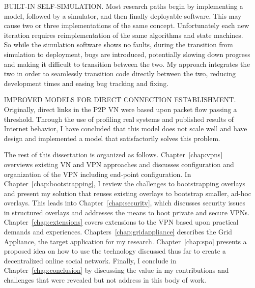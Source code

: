 BUILT-IN SELF-SIMULATION. Most research paths begin by implementing a model,
followed by a simulator, and then finally deployable software.  This may cause
two or three implementations of the same concept.  Unfortunately each new
iteration requires reimplementation of the same algorithms and state machines.
So while the simulation software shows no faults, during the transition from
simulation to deployment, bugs are introduced, potentially slowing down
progress and making it difficult to transition between the two.  My approach
integrates the two in order to seamlessly transition code directly between the
two, reducing development times and easing bug tracking and fixing.

IMPROVED MODELS FOR DIRECT CONNECTION ESTABLISHMENT.  Originally, direct links
in the P2P VN were based upon packet flow passing a threshold.  Through the use
of profiling real systems and published results of Internet behavior, I have
concluded that this model does not scale well and have design and implemented a
model that satisfactorily solves this problem.

The rest of this dissertation is organized as follows.  Chapter~\ref{chap:vpns}
overviews existing VN and VPN approaches and discusses configuration and
organization of the VPN including end-point configuration.  In
Chapter~\ref{chap:bootstrapping}, I review the challenges to bootstrapping
overlays and present my solution that reuses existing overlays to bootstrap
smaller, ad-hoc overlays.  This leads into Chapter~\ref{chap:security}, which
discusses security issues in structured overlays and addresses the means to
boot private and secure VPNs.  Chapter~\ref{chap:extensions} covers extensions
to the VPN based upon practical demands and experiences.
Chapters~\ref{chap:gridappliance} describes the Grid Appliance, the target
application for my research.  Chapter~\ref{chap:spo} presents a proposed idea
on how to use the technology discussed thus far to create a decentralized
online social network.  Finally, I conclude in Chapter~\ref{chap:conclusion} by
discussing the value in my contributions and challenges that were revealed but
not address in this body of work.
